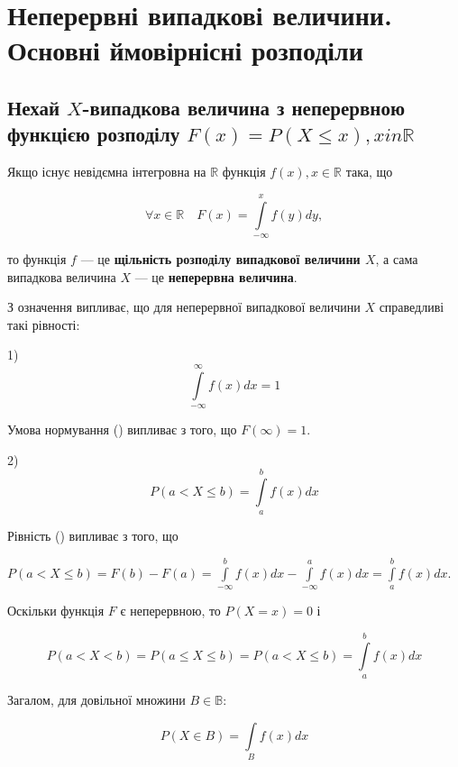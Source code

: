 \chapter{Неперервні випадкові величини. Основні ймовірнісні розподіли}

\section{Нехай $X$-випадкова величина з неперервною функцією розподілу $F(x) = P(X \leqslant x), x in \mathbb{R}$}

Якщо існує невідємна інтегровна на $\mathbb{R}$ функція
$f(x), x \in \mathbb{R}$ така, що

\begin{equation}
    \forall x \in \mathbb{R} \quad F(x) = \int\limits_{-\infty}^{x} f(y) dy,
\end{equation}

то функція $f$ --- це \textbf{щільність розподілу випадкової величини $X$},
а сама випадкова величина $X$ --- це \textbf{неперервна величина}.

З означення випливає, що для неперервної випадкової величини $X$ справедливі такі рівності:

1) \begin{equation}
    \int\limits_{-\infty}^{\infty} f(x) dx = 1
\end{equation}

Умова нормування () випливає з того, що $F(\infty) = 1$.

2) \begin{equation}
    P(a < X \leqslant b) = \int\limits_{a}^{b} f(x) dx
\end{equation}

Рівність () випливає з того, що 

$P(a < X \leqslant b) = F(b) - F(a)
= \int\limits_{-\infty}^{b} f(x) dx - \int\limits_{-\infty}^{a} f(x) dx
= \int\limits_{a}^{b} f(x) dx.$

Оскільки функція $F$ є неперервною, то $P(X = x) = 0$ і

\begin{equation}
    P(a < X < b) = P(a \leqslant X \leqslant b)
    = P(a < X \leqslant b)
    = \int\limits_{a}^{b} f(x) dx
\end{equation}

Загалом, для довільної множини $B \in \mathbb{B}$:

\begin{equation}
    P(X \in B) = \int\limits_{B} f(x) dx
\end{equation}

